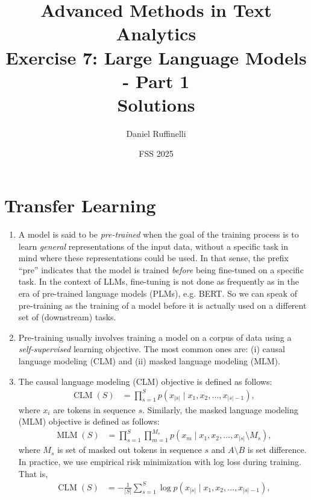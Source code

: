 \documentclass[11pt,a4paper]{article}
\title{Advanced Methods in Text Analytics \\ 
Exercise 7: Large Language Models - Part 1\\
\textbf{Solutions}}
\author{Daniel Ruffinelli}
\date{FSS 2025}
\newcommand\op[1]{\operatorname{#1}}
\begin{document}
\maketitle

\section{Transfer Learning}

\begin{enumerate}[label=(\alph*)]
    \item A model is said to be \emph{pre-trained} when the goal of the training
          process is to learn \emph{general} representations of the input data,
          without a specific task in mind where these representations could be
          used.
          In that sense, the prefix ``pre'' indicates that the model
          is trained \emph{before} being fine-tuned on a specific task.
          In the context of LLMs, fine-tuning is not done as frequently as in
          the era of pre-trained language models (PLMs), e.g. BERT.
          So we can speak of pre-training as the training of a model before it
          is actually used on a different set of (downstream) tasks.
    \item Pre-training usually involves training a model on a corpus of data
          using a \emph{self-supervised} learning objective.
          The most common ones are: (i) causal language modeling (CLM) and (ii)
          masked language modeling (MLM).
    \item The causal language modeling (CLM) objective is defined as follows:
          \begin{align}
              \op{CLM}(S) & = \prod_{s=1}^{S} p(x_{|s|} \mid x_1, x_2, \ldots, x_{|s|-1}),
          \end{align}
          where $x_i$ are tokens in sequence $s$.
          Similarly, the masked language modeling (MLM) objective is defined as
          follows:
          \begin{align}
              \op{MLM}(S) & = \prod_{s=1}^{S} \prod_{m=1}^{M_s} p(x_m \mid x_1, x_2, \ldots, x_{|s|} \setminus M_s),
          \end{align}
          where $M_s$ is set of masked out tokens in sequence $s$ and
          $A \setminus B$ is set difference.
          In practice, we use empirical risk minimization with log loss during
          training. That is,
          \begin{align}
              \op{CLM}(S) & = - \frac{1}{|S|} \sum_{s=1}^{S} \log p(x_{|s|} \mid x_1, x_2, \ldots, x_{|s|-1}),

\end{align}
\end{enumerate}
\end{document}
